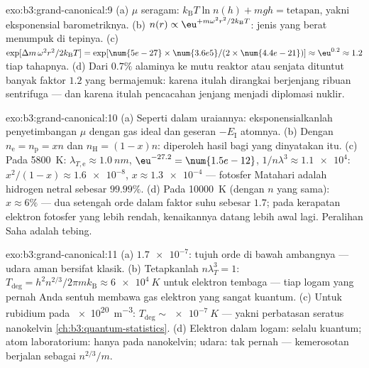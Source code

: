\begin{solution}{exo:b3:grand-canonical:9}
(a) $\mu$ seragam: $k_{\text{B}}T\ln n(h) + mgh = \text{tetapan}$, yakni
eksponensial barometriknya. (b) $n(r) \propto
\eu^{+m\omega^2r^2/2k_{\text{B}}T}$: jenis yang berat menumpuk di
tepinya. (c) $\exp[\Delta m\,\omega^2r^2/2k_{\text{B}}T] =
\exp[\num{5e-27} \times \num{3.6e5}/(2 \times \num{4.4e-21})]
\approx \eu^{0.2} \approx 1.2$ tiap tahapnya. (d) Dari $0.7\%$ alaminya
ke mutu reaktor atau senjata dituntut banyak faktor
$1.2$ yang bermajemuk: karena itulah dirangkai berjenjang ribuan
sentrifuga --- dan karena itulah pencacahan jenjang menjadi diplomasi nuklir.
\end{solution}

\begin{solution}{exo:b3:grand-canonical:10}
(a) Seperti dalam uraiannya: eksponensialkanlah penyetimbangan $\mu$ dengan
 gas ideal dan geseran $-E_{\text{I}}$ atomnya. (b)
Dengan $n_{\text{e}} = n_{\text{p}} = xn$ dan $n_{\text{H}} =
(1-x)n$: diperoleh hasil bagi yang dinyatakan itu. (c) Pada \qty{5800}{K}:
$\lambda_{T,\text{e}} \approx \qty{1.0}{nm}$,
$\eu^{-27.2} = \num{1.5e-12}$, $1/n\lambda^3 \approx \num{1.1e4}$:
$x^2/(1-x) \approx \num{1.6e-8}$, $x \approx \num{1.3e-4}$ ---
fotosfer Matahari adalah hidrogen netral sebesar $99.99\%$. (d) Pada
\qty{10000}{K} (dengan $n$ yang sama): $x \approx 6\%$ --- dua setengah
orde dalam faktor suhu sebesar $1.7$; pada kerapatan elektron fotosfer
yang lebih rendah, kenaikannya datang lebih awal lagi. Peralihan Saha
adalah tebing.
\end{solution}

\begin{solution}{exo:b3:grand-canonical:11}
(a) $\num{1.7e-7}$: tujuh orde di bawah ambangnya --- udara aman
bersifat klasik. (b) Tetapkanlah $n\lambda_T^3 = 1$: $T_{\text{deg}} =
h^2n^{2/3}/2\pi mk_{\text{B}} \approx \qty{6e4}{K}$ untuk elektron
tembaga --- tiap logam yang pernah Anda sentuh membawa gas elektron
yang sangat kuantum. (c) Untuk rubidium pada \qty{e20}{m^{-3}}:
$T_{\text{deg}} \sim \qty{e-7}{K}$ --- yakni perbatasan seratus
nanokelvin \cref{ch:b3:quantum-statistics}. (d) Elektron dalam
logam: selalu kuantum; atom laboratorium: hanya pada nanokelvin;
udara: tak pernah --- kemerosotan berjalan sebagai $n^{2/3}/m$.
\end{solution}

